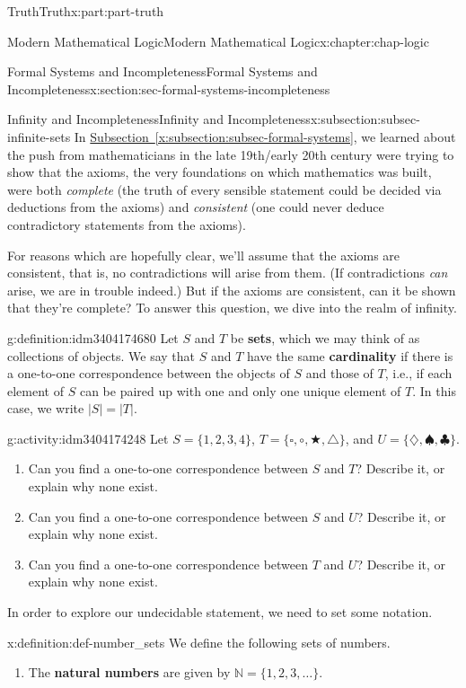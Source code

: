 \documentclass[oneside,10pt,]{book}
\newcommand{\xreffont}{\relax}
\newcommand{\terminology}[1]{\textbf{#1}}
\numberwithin{equation}{section}
\begin{document}
\begin{partptx}{Truth}{}{Truth}{}{}{x:part:part-truth}
\begin{chapterptx}{Modern Mathematical Logic}{}{Modern Mathematical Logic}{}{}{x:chapter:chap-logic}
\begin{sectionptx}{Formal Systems and Incompleteness}{}{Formal Systems and Incompleteness}{}{}{x:section:sec-formal-systems-incompleteness}
\begin{subsectionptx}{Infinity and Incompleteness}{}{Infinity and Incompleteness}{}{}{x:subsection:subsec-infinite-sets}
In \hyperref[x:subsection:subsec-formal-systems]{Subsection~{\xreffont\ref{x:subsection:subsec-formal-systems}}}, we learned about the push from mathematicians in the late 19th\slash{}early 20th century were trying to show that the axioms, the very foundations on which mathematics was built, were both \emph{complete} (the truth of every sensible statement could be decided via deductions from the axioms) and \emph{consistent} (one could never deduce contradictory statements from the axioms).%
\par
For reasons which are hopefully clear, we'll assume that the axioms are consistent, that is, no contradictions will arise from them. (If contradictions \emph{can} arise, we are in trouble indeed.) But if the axioms are consistent, can it be shown that they're complete? To answer this question, we dive into the realm of infinity.%
\begin{definition}{}{g:definition:idm3404174680}%
Let \(S\) and \(T\) be \terminology{sets}, which we may think of as collections of objects. We say that \(S\) and \(T\) have the same \terminology{cardinality} if there is a one-to-one correspondence between the objects of \(S\) and those of \(T\), i.e., if each element of \(S\) can be paired up with one and only one unique element of \(T\). In this case, we write \(|S| = |T|\).%
\end{definition}
\begin{activity}{}{g:activity:idm3404174248}%
Let \(S = \{1,2,3,4\}\), \(T=\{\square,\circ,\bigstar,\triangle\}\), and \(U = \{\diamondsuit,\spadesuit,\clubsuit\}\).%
%
\begin{enumerate}
\item{}Can you find a one-to-one correspondence between \(S\) and \(T\)? Describe it, or explain why none exist.%
\item{}Can you find a one-to-one correspondence between \(S\) and \(U\)? Describe it, or explain why none exist.%
\item{}Can you find a one-to-one correspondence between \(T\) and \(U\)? Describe it, or explain why none exist.%
\end{enumerate}
\end{activity}%
In order to explore our undecidable statement, we need to set some notation.%
\begin{definition}{}{x:definition:def-number_sets}%
We define the following sets of numbers.%
%
\begin{enumerate}
\item{}The \terminology{natural numbers} are given by \(\mathbb{N} = \{1, 2, 3, \ldots\}\).%

\end{enumerate}
\end{definition}
\end{subsectionptx}
\end{sectionptx}
\end{chapterptx}
\end{partptx}
\end{document}
